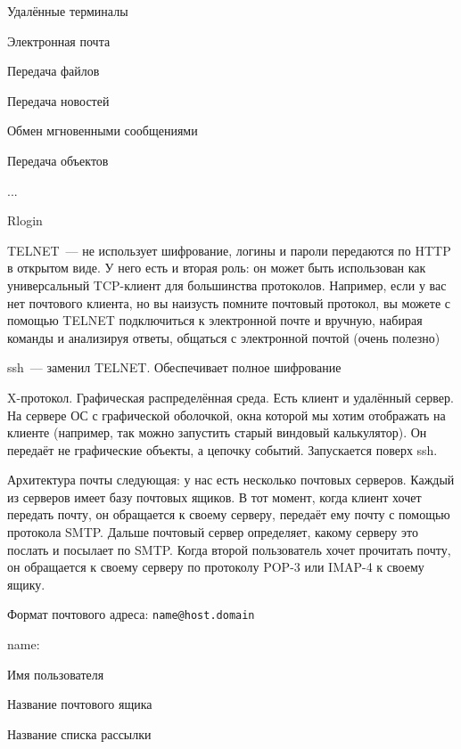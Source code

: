 
\begin{MyItemize}
    \item Удалённые терминалы
    \item Электронная почта
    \item Передача файлов
    \item Передача новостей
    \item Обмен мгновенными сообщениями
    \item Передача объектов
    \item ...
\end{MyItemize}


\begin{MyItemize}
    \item Rlogin
    \item TELNET~--- не использует шифрование, логины и пароли передаются по HTTP в открытом виде. У него есть и вторая роль: он может быть использован как универсальный TCP-клиент для большинства протоколов. Например, если у вас нет почтового клиента, но вы наизусть помните почтовый протокол, вы можете с помощью TELNET подключиться к электронной почте и вручную, набирая команды и анализируя ответы, общаться с электронной почтой (очень полезно)
    \item ssh~--- заменил TELNET. Обеспечивает полное шифрование
    \item X-протокол. Графическая распределённая среда. Есть клиент и удалённый сервер. На сервере ОС с графической оболочкой, окна которой мы хотим отображать на клиенте (например, так можно запустить старый виндовый калькулятор). Он передаёт не графические объекты, а цепочку событий. Запускается поверх ssh.
\end{MyItemize}


Архитектура почты следующая: у нас есть несколько почтовых серверов. Каждый из серверов имеет базу почтовых ящиков. В тот момент, когда клиент хочет передать почту, он обращается к своему серверу, передаёт ему почту с помощью протокола SMTP. Дальше почтовый сервер определяет, какому серверу это послать и посылает по SMTP. Когда второй пользователь хочет прочитать почту, он обращается к своему серверу по протоколу POP-3 или IMAP-4 к своему ящику.

Формат почтового адреса: {\tt name@host.domain}
\begin{MyItemize}
    \item name:
    \begin{MyItemize}
        \item Имя пользователя
        \item Название почтового ящика
        \item Название списка рассылки
    \end{MyItemize}
\end{MyItemize}

